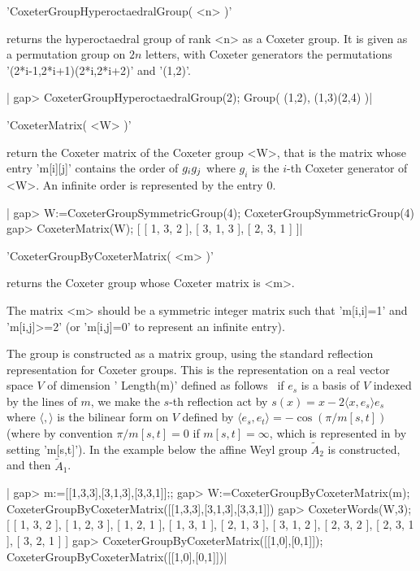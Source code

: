 'CoxeterGroupHyperoctaedralGroup( <n> )'

returns the hyperoctaedral group of rank <n> as a Coxeter group. It is
given as a permutation group on $2n$ letters, with Coxeter generators
the permutations '(2*i-1,2*i+1)(2*i,2*i+2)' and '(1,2)'.

|    gap> CoxeterGroupHyperoctaedralGroup(2);
    Group( (1,2), (1,3)(2,4) )|


'CoxeterMatrix( <W> )'

return the Coxeter  matrix of the Coxeter group <W>,  that is the matrix
whose entry  'm[i][j]' contains the  order of $g_i\*g_j$ where  $g_i$ is
the $i$-th Coxeter generator of <W>. An infinite order is represented by
the entry 0.

|    gap> W:=CoxeterGroupSymmetricGroup(4);
    CoxeterGroupSymmetricGroup(4)
    gap> CoxeterMatrix(W);
    [ [ 1, 3, 2 ], [ 3, 1, 3 ], [ 2, 3, 1 ] ]|


'CoxeterGroupByCoxeterMatrix( <m> )'

returns  the  Coxeter  group  whose  Coxeter  matrix  is  <m>.

The  matrix <m> should  be a symmetric  integer matrix such that 'm[i,i]=1'
and 'm[i,j]>=2' (or 'm[i,j]=0' to represent an infinite entry).

The  group is constructed as a  matrix group, using the standard reflection
representation  for Coxeter  groups. This  is the  representation on a real
vector  space $V$ of dimension ' Length(m)' defined as follows \:\ if $e_s$
is  a  basis  of  $V$  indexed  by  the  lines  of  $m$, we make the $s$-th
reflection act by $s(x)=x-2\langle x, e_s\rangle e_s$ where
$\langle,\rangle$   is  the  bilinear  form  on  $V$  defined  by  $\langle
e_s,e_t\rangle=-\cos(\pi/m[s,t])$  (where  by  convention $\pi/m[s,t]=0$ if
$m[s,t]=\infty$,   which   is   represented   in   {\CHEVIE}   by   setting
'm[s,t]').  In the example below the  affine Weyl group $\tilde A_2$ is
constructed, and then $\tilde A_1$.

|    gap> m:=[[1,3,3],[3,1,3],[3,3,1]];;
    gap> W:=CoxeterGroupByCoxeterMatrix(m);
    CoxeterGroupByCoxeterMatrix([[1,3,3],[3,1,3],[3,3,1]])
    gap> CoxeterWords(W,3);
    [ [ 1, 3, 2 ], [ 1, 2, 3 ], [ 1, 2, 1 ], [ 1, 3, 1 ], [ 2, 1, 3 ],
      [ 3, 1, 2 ], [ 2, 3, 2 ], [ 2, 3, 1 ], [ 3, 2, 1 ] ]
    gap> CoxeterGroupByCoxeterMatrix([[1,0],[0,1]]);
    CoxeterGroupByCoxeterMatrix([[1,0],[0,1]])|

